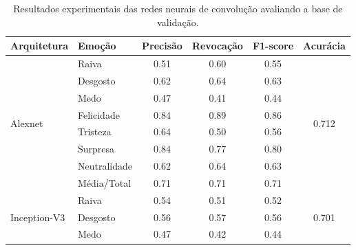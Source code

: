 \begin{table}[]
\centering
\caption{Resultados experimentais das redes neurais de convolução avaliando a base de validação.}
\label{table:resultsexp}
\begin{tabular}{llcccc}
\hline
\textbf{Arquitetura}                & \textbf{Emoção}       & \textbf{Precisão} & \textbf{Revocação} & \textbf{F1-score} & \textbf{Acurácia}               \\ \hline
\multirow{8}{*}{Alexnet}            & Raiva                 & 0.51              & 0.60               & 0.55              & \multirow{8}{*}{0.712}          \\
                                    & Desgosto              & 0.62              & 0.64               & 0.63              &                                 \\
                                    & Medo                  & 0.47              & 0.41               & 0.44              &                                 \\
                                    & Felicidade            & 0.84              & 0.89               & 0.86              &                                 \\
                                    & Tristeza              & 0.64              & 0.50               & 0.56              &                                 \\
                                    & Surpresa              & 0.84              & 0.77               & 0.80              &                                 \\
                                    & Neutralidade          & 0.62              & 0.64               & 0.63              &                                 \\
                                    & Média/Total           & 0.71              & 0.71               & 0.71              &                                 \\ \hline
\multirow{8}{*}{Inception-V3}       & Raiva                 & 0.54              & 0.51               & 0.52              & \multirow{8}{*}{0.701}          \\
                                    & Desgosto              & 0.56              & 0.57               & 0.56              &                                 \\
                                    & Medo                  & 0.47              & 0.42               & 0.44              &                                 \\

\end{tabular}
\end{table}
